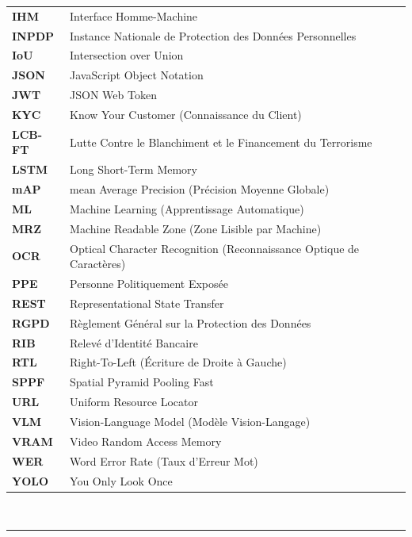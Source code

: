 \documentclass[12pt,a4paper]{report}
\newcommand{\titrespecial}[1]{%
  \noindent{\normalfont\LARGE\bfseries\color{bleu_principal} #1}\\[-0.3em]%
  \noindent\textcolor{bleu_principal}{\rule{\textwidth}{0.8pt}}%
  \vspace{1em}%
}
\begin{document}
\begin{longtable}{@{}>{\bfseries}p{3.5cm}p{12cm}@{}}
  IHM     & Interface Homme-Machine \\
  INPDP   & Instance Nationale de Protection des Données Personnelles \\
  IoU     & Intersection over Union \\
  JSON    & JavaScript Object Notation \\
  JWT     & JSON Web Token \\
  KYC     & Know Your Customer (Connaissance du Client) \\
  LCB-FT  & Lutte Contre le Blanchiment et le Financement du Terrorisme \\
  LSTM    & Long Short-Term Memory \\
  mAP     & mean Average Precision (Précision Moyenne Globale) \\
  ML      & Machine Learning (Apprentissage Automatique) \\
  MRZ     & Machine Readable Zone (Zone Lisible par Machine) \\
  OCR     & Optical Character Recognition (Reconnaissance Optique de Caractères) \\
  PPE     & Personne Politiquement Exposée \\
  REST    & Representational State Transfer \\
  RGPD    & Règlement Général sur la Protection des Données \\
  RIB     & Relevé d'Identité Bancaire \\
  RTL     & Right-To-Left (Écriture de Droite à Gauche) \\
  SPPF    & Spatial Pyramid Pooling Fast \\
  URL     & Uniform Resource Locator \\
  VLM     & Vision-Language Model (Modèle Vision-Langage) \\
  VRAM    & Video Random Access Memory \\
  WER     & Word Error Rate (Taux d'Erreur Mot) \\
  YOLO    & You Only Look Once \\
\end{longtable}
\clearpage


\clearpage
\thispagestyle{fancy}

\titrespecial{Introduction Générale}
\end{document}

